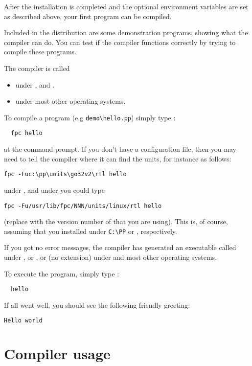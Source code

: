 After the installation is completed and the optional environment variables 
are set as described above, your first program can be compiled.

Included in the \fpc distribution are some demonstration programs,
showing what the compiler can do.
You can test if the compiler functions correctly by trying to compile
these programs.

The compiler is called
\begin{itemize}
\item {} under \windows, \ostwo and \dos.
\item {} under most other operating systems.
\end{itemize}
To compile a program (e.g \verb|demo\hello.pp|) simply type :
\begin{verbatim}
  fpc hello
\end{verbatim}
at the command prompt. If you don't have a configuration file, then you may
need to tell the compiler where it can find the units, for instance as
follows:
\begin{verbatim}
fpc -Fuc:\pp\units\go32v2\rtl hello
\end{verbatim}
under \dos, and under \linux you could type
\begin{verbatim}
fpc -Fu/usr/lib/fpc/NNN/units/linux/rtl hello
\end{verbatim}
(replace  with the version number of \fpc that you are using).
This is, of course, assuming that you installed under \verb|C:\PP| or
, respectively.

If you got no error messages, the compiler has generated an executable
called  under \dos, \ostwo or \windows, or  
(no extension) under \unix and most other operating systems.

To execute the program, simply type :
\begin{verbatim}
  hello
\end{verbatim}
If all went well, you should see the following friendly greeting:
\begin{verbatim}
Hello world
\end{verbatim}

\chapter{Compiler usage}
\label{ch:Usage}

